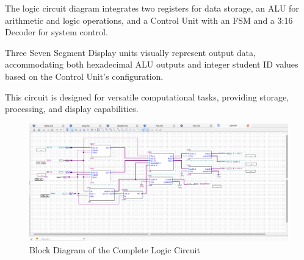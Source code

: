 
{The logic circuit diagram integrates two registers for data storage, an ALU for arithmetic and logic operations, and a Control Unit with an FSM and a 3:16 Decoder for system control.}

{Three Seven Segment Display units visually represent output data, accommodating both hexadecimal ALU outputs and integer student ID values based on the Control Unit's configuration.}

{This circuit is designed for versatile computational tasks, providing storage, processing, and display capabilities.}

\begin{figure}[H]
    \centering
    \includegraphics[width=16cm]{Pictures/BlockDiagram.png}
    \caption{{Block Diagram of the Complete Logic Circuit}}
    \label{}
\end{figure}
